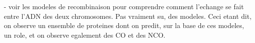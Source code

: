 - voir les modeles de recombinaison pour comprendre comment l'echange se fait entre l'ADN des deux chromosomes. Pas vraiment su, des modeles. Ceci etant dit, on observe un ensemble de proteines dont on predit, sur la base de ces modeles, un role, et on observe egalement des CO et des NCO\@.







